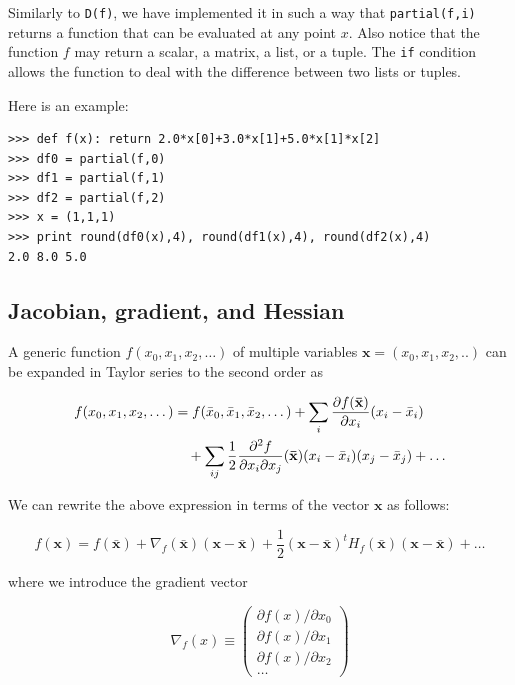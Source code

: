 \documentclass[justified,sixbynine]{tufte-book}
\def\ft{\small\tt}
\theoremstyle{plain}%
\theoremstyle{definition}
\theoremstyle{remark}
\begin{document}
\begin{fullwidth}
Similarly to {\ft D(f)}, we have implemented it in such a way that {\ft partial(f,i)} returns a function that can be evaluated at any point $x$. Also notice that the function $f$ may return a scalar, a matrix, a list, or a tuple. The {\ft if} condition allows the function to deal with the difference between two lists or tuples.

Here is an example:

\begin{lstlisting}[caption={in file: {\ft nlib.py}}]
>>> def f(x): return 2.0*x[0]+3.0*x[1]+5.0*x[1]*x[2]
>>> df0 = partial(f,0)
>>> df1 = partial(f,1)
>>> df2 = partial(f,2)
>>> x = (1,1,1)
>>> print round(df0(x),4), round(df1(x),4), round(df2(x),4)
2.0 8.0 5.0
\end{lstlisting}

\goodbreak\subsection{Jacobian, gradient, and Hessian}


A generic function $f(x_0,x_1,x_2,\dots)$ of multiple variables $\mathbf{x}=(x_0,x_1,x_2,..)$ can be expanded in Taylor series to the second order as

\begin{align}
f(x_0,x_1,x_2,\dots) &= f(\bar x_0,\bar x_1, \bar x_2,\dots) + 
                     \sum_i \frac{\partial f(\mathbf{\bar x})}{\partial x_i}(x_i-\bar x_i) \notag\\ 
                   &\quad + \sum_{ij} \frac12 \frac{\partial^2 f}{\partial x_i\partial x_j}(\mathbf{\bar x})(x_i-\bar x_i)(x_j-\bar x_j) +\dots 
\end{align}

We can rewrite the above expression in terms of the vector $\mathbf{x}$ as follows:

\begin{equation}
f(\mathbf{x}) = f(\mathbf{\bar x}) + \nabla_f(\mathbf{\bar x})(\mathbf{x}-\mathbf{\bar x})
+ \frac12 (\mathbf{x}-\mathbf{\bar x})^t H_f(\mathbf{\bar x})(\mathbf{x}-\mathbf{\bar x}) +\dots 
\end{equation}

where we introduce the gradient vector

\begin{equation}
\nabla_f(x) \equiv 
\begin{pmatrix}
\partial f(x)/\partial x_0 \\
\partial f(x)/\partial x_1 \\
\partial f(x)/\partial x_2 \\
\dots
\end{pmatrix}
\end{equation}


\end{fullwidth}
\end{document}
